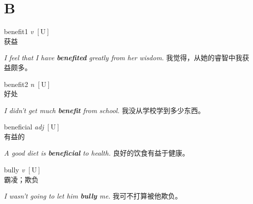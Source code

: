 \section{B}

\item[] {
    \lettrine{benefit}{1}  
    \textit{v} 
    $\mathrm{[U]}$ 
    \\
    获益

    \textit{I feel that I have \textbf{benefited} greatly from her wisdom.}
    我觉得，从她的睿智中我获益颇多。

}

\item[] {
    \lettrine{benefit}{2}  
    \textit{n} 
    $\mathrm{[U]}$ 
    \\
    好处

    \textit{I didn't get much \textbf{benefit} from school. }
    我没从学校学到多少东西。

}

\item[] {
    \lettrine{beneficial}{}  
    \textit{adj} 
    $\mathrm{[U]}$ 
    \\
    有益的

    \textit{A good diet is \textbf{beneficial} to health. }
    良好的饮食有益于健康。

}

\item[] {
    \lettrine{bully}{}  
    \textit{v} 
    $\mathrm{[U]}$ 
    \\
    霸凌；欺负

    \textit{I wasn't going to let him \textbf{bully} me. }
    我可不打算被他欺负。

}